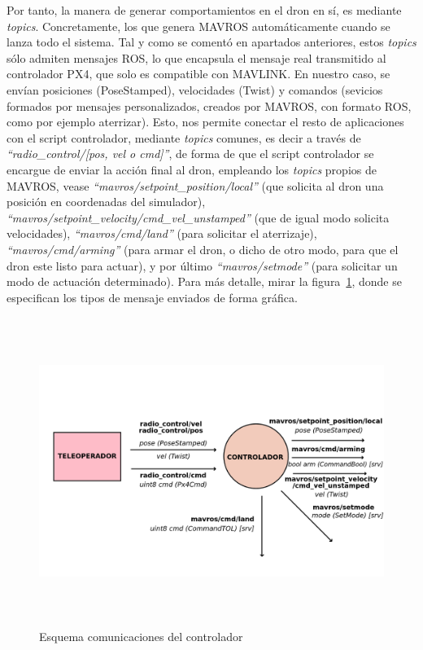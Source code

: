Por tanto, la manera de generar comportamientos en el dron en sí, es mediante \emph{topics}. Concretamente, los que genera MAVROS automáticamente cuando se lanza todo el sistema. Tal y como se comentó en apartados anteriores, estos \emph{topics} sólo admiten mensajes \ac{ROS}, lo que encapsula el mensaje real transmitido al controlador PX4, que solo es compatible con MAVLINK. En nuestro caso, se envían posiciones (PoseStamped), velocidades (Twist) y comandos (sevicios formados por mensajes personalizados, creados por MAVROS, con formato \ac{ROS}, como por ejemplo aterrizar). Esto, nos permite conectar el resto de aplicaciones con el script controlador, mediante \emph{topics} comunes, es decir a través de \emph{``radio\_control/[pos, vel o cmd]''}, de forma de que el script controlador se encargue de enviar la acción final al dron, empleando los \emph{topics} propios de MAVROS, vease \emph{``mavros/setpoint\_position/local''} (que solicita al dron una posición en coordenadas del simulador), \emph{``mavros/setpoint\_velocity/cmd\_vel\_unstamped''} (que de igual modo solicita velocidades), \emph{``mavros/cmd/land''} (para solicitar el aterrizaje), \emph{``mavros/cmd/arming''} (para armar el dron, o dicho de otro modo, para que el dron este listo para actuar), y por último \emph{``mavros/setmode''} (para solicitar un modo de actuación determinado). Para más detalle, mirar la figura~\ref{fig:diagrama2}, donde se especifican los tipos de mensaje enviados de forma gráfica.\\

\begin{figure} [tp]
	\begin{center}
	\includegraphics[height=10cm]{imagenes/cap4/4_esquema_coms.png}
	\end{center}
	\caption[Esquema comunicaciones del controlador]{Esquema comunicaciones del controlador}
	\label{fig:diagrama2}
\end{figure}

